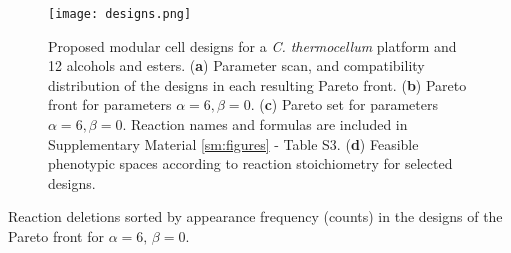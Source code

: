 \begin{figure}[hp]
    \centering
    \texttt{[image: designs.png]}
    \caption[Proposed modular cell designs for a \protect\textit{C. thermocellum} platform and 12 alcohols and esters]{Proposed modular cell designs for a \protect\textit{C. thermocellum} platform and 12 alcohols and esters. (\textbf{a}) Parameter scan, and compatibility distribution of the designs in each resulting Pareto front. (\textbf{b}) Pareto front for parameters $\alpha=6,\beta=0$. (\textbf{c}) Pareto set for parameters $\alpha=6,\beta=0$. Reaction names and formulas are included in Supplementary Material \ref{sm:figures} - Table S3. (\textbf{d}) Feasible phenotypic spaces according to reaction stoichiometry for selected designs.}
   \label{fig6:designs}
\end{figure}

\begin{table}[hp]
    \caption{Reaction deletions sorted by appearance frequency (counts) in the designs of the Pareto front for $\alpha=6,\,\beta=0$.}
    \centering
    
    \label{tab:deletions}
\end{table}

